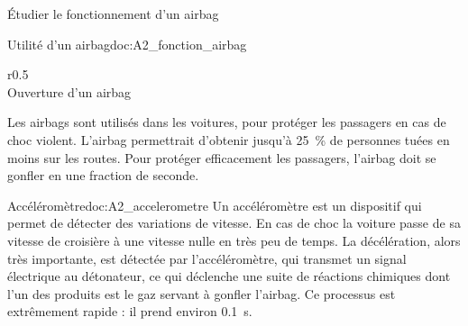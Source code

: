 \teteTermStssRout

\vspace*{-0pt}
\nomPrenomClasse
{}


\begin{objectifs}
  \item Étudier le fonctionnement d'un airbag
\end{objectifs}


\begin{doc}{Utilité d'un airbag}{doc:A2_fonction_airbag}
  \begin{wrapfigure}{r}{0.5\linewidth}  
    \centering
    \vspace*{-24pt}
     \\
    \small{Ouverture d'un airbag}
  \end{wrapfigure}
  
  Les airbags sont utilisés dans les voitures, pour protéger les passagers en cas de choc violent.
  L'airbag permettrait d'obtenir jusqu'à \qty{25}{\percent} de personnes tuées en moins sur les routes.
  Pour protéger efficacement les passagers, l'airbag doit se gonfler en une fraction de seconde.
\end{doc}

\begin{doc}{Accéléromètre}{doc:A2_accelerometre}
  Un accéléromètre est un dispositif qui permet de détecter des variations de vitesse.
  En cas de choc la voiture passe de sa vitesse de croisière à une vitesse nulle en très peu de temps.
  La décélération, alors très importante, est détectée par l'accéléromètre, qui transmet un signal électrique au détonateur, ce qui déclenche une suite de réactions chimiques dont l'un des produits est le gaz servant à gonfler l'airbag.
  Ce processus est extrêmement rapide : il prend environ \qty{0,1}{\s}.
\end{doc}

